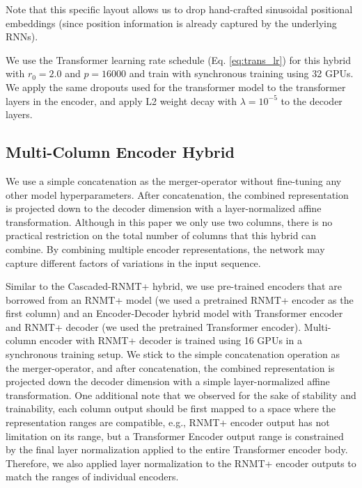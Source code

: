 \documentclass[11pt,a4paper]{article}
\begin{document}
Note that this specific layout allows us to drop hand-crafted sinusoidal
positional embeddings (since position information is already captured by
the underlying RNNs).

We use the Transformer learning rate schedule (Eq. \ref{eq:trans_lr})
for this hybrid with $r_0=2.0$ and $p=16000$ and train with
synchronous training using 32 GPUs. We apply the same dropouts
used for the transformer model to the transformer layers in the
encoder, and apply L2 weight decay with $\lambda = 10^{-5}$ to the decoder layers.

\subsection{Multi-Column Encoder Hybrid}
\label{horizontal_mixing}

We use a simple concatenation as the merger-operator without
fine-tuning any other model hyperparameters. After
concatenation, the combined representation is projected down to the
decoder dimension with a layer-normalized affine transformation.
Although in this paper we only use two columns, there is no practical
restriction on the total number of columns that this hybrid can
combine. By combining multiple encoder representations, the network
may capture different factors of variations in the input sequence.

Similar to the Cascaded-RNMT+ hybrid, we use pre-trained encoders that
are borrowed from an RNMT+ model (we used a pretrained RNMT+ encoder as
the first column) and an Encoder-Decoder hybrid model with Transformer
encoder and RNMT+ decoder (we used the pretrained Transformer
encoder). Multi-column encoder with RNMT+ decoder is trained using 16
GPUs in a synchronous training setup. We stick to the simple
concatenation operation as the merger-operator, and after
concatenation, the combined representation is projected down the
decoder dimension with a simple layer-normalized affine
transformation. One additional note that we observed for the sake of
stability and trainability, each column output should be first mapped
to a space where the representation ranges are compatible, e.g., RNMT+
encoder output has not limitation on its range, but a Transformer
Encoder output range is constrained by the final layer normalization
applied to the entire Transformer encoder body. Therefore, we also
applied layer normalization to the RNMT+ encoder outputs to match the
ranges of individual encoders.
\end{document}
